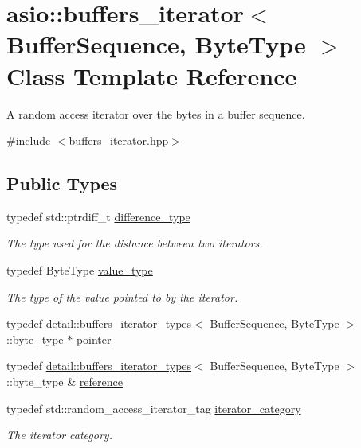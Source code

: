 \hypertarget{classasio_1_1buffers__iterator}{}\section{asio\+:\+:buffers\+\_\+iterator$<$ Buffer\+Sequence, Byte\+Type $>$ Class Template Reference}
\label{classasio_1_1buffers__iterator}


A random access iterator over the bytes in a buffer sequence.  




{\ttfamily \#include $<$buffers\+\_\+iterator.\+hpp$>$}

\subsection*{Public Types}
\begin{DoxyCompactItemize}
\item 
typedef std\+::ptrdiff\+\_\+t \hyperlink{classasio_1_1buffers__iterator_a959fca11c49c2ecb423eb22ccad8062b}{difference\+\_\+type}
\begin{DoxyCompactList}\small\item\em The type used for the distance between two iterators. \end{DoxyCompactList}\item 
typedef Byte\+Type \hyperlink{classasio_1_1buffers__iterator_aa350a7aa5afa6fbf17ecd4f8cc349821}{value\+\_\+type}
\begin{DoxyCompactList}\small\item\em The type of the value pointed to by the iterator. \end{DoxyCompactList}\item 
typedef \hyperlink{structasio_1_1detail_1_1buffers__iterator__types}{detail\+::buffers\+\_\+iterator\+\_\+types}$<$ Buffer\+Sequence, Byte\+Type $>$\+::byte\+\_\+type $\ast$ \hyperlink{classasio_1_1buffers__iterator_a15f732e586b13d7b0d23b5b2ea3b3cb9}{pointer}
\item 
typedef \hyperlink{structasio_1_1detail_1_1buffers__iterator__types}{detail\+::buffers\+\_\+iterator\+\_\+types}$<$ Buffer\+Sequence, Byte\+Type $>$\+::byte\+\_\+type \& \hyperlink{classasio_1_1buffers__iterator_aa57e1b880d781aa295f143cb4f5db61d}{reference}
\item 
typedef std\+::random\+\_\+access\+\_\+iterator\+\_\+tag \hyperlink{classasio_1_1buffers__iterator_a259930bc88ee38a9e9bf9e65aa06dd8c}{iterator\+\_\+category}
\begin{DoxyCompactList}\small\item\em The iterator category. \end{DoxyCompactList}\end{DoxyCompactItemize}
